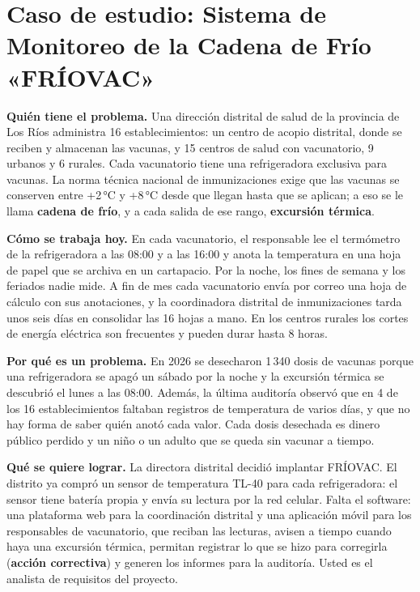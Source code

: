 \documentclass[11pt]{article}
\newcommand{\seccion}[1]{\section{\textcolor{utegreendk}{#1}}}
\begin{document}

\seccion{Caso de estudio: Sistema de Monitoreo de la Cadena de Frío «FRÍOVAC»}




\begin{cajacaso}[title={El problema que hay que resolver}]

	\textbf{Quién tiene el problema.} Una dirección distrital de salud de la provincia de Los Ríos administra 16 establecimientos: un centro de acopio distrital, donde se reciben y almacenan las vacunas, y 15 centros de salud con vacunatorio, 9 urbanos y 6 rurales. Cada vacunatorio tiene una refrigeradora exclusiva para vacunas. La norma técnica nacional de inmunizaciones exige que las vacunas se conserven entre +2\,°C y +8\,°C desde que llegan hasta que se aplican; a eso se le llama \textbf{cadena de frío}, y a cada salida de ese rango, \textbf{excursión térmica}.\par\smallskip

	\textbf{Cómo se trabaja hoy.} En cada vacunatorio, el responsable lee el termómetro de la refrigeradora a las 08:00 y a las 16:00 y anota la temperatura en una hoja de papel que se archiva en un cartapacio. Por la noche, los fines de semana y los feriados nadie mide. A fin de mes cada vacunatorio envía por correo una hoja de cálculo con sus anotaciones, y la coordinadora distrital de inmunizaciones tarda unos seis días en consolidar las 16 hojas a mano. En los centros rurales los cortes de energía eléctrica son frecuentes y pueden durar hasta 8 horas.\par\smallskip

	\textbf{Por qué es un problema.} En 2026 se desecharon 1\,340 dosis de vacunas porque una refrigeradora se apagó un sábado por la noche y la excursión térmica se descubrió el lunes a las 08:00. Además, la última auditoría observó que en 4 de los 16 establecimientos faltaban registros de temperatura de varios días, y que no hay forma de saber quién anotó cada valor. Cada dosis desechada es dinero público perdido y un niño o un adulto que se queda sin vacunar a tiempo.\par\smallskip

	\textbf{Qué se quiere lograr.} La directora distrital decidió implantar FRÍOVAC. El distrito ya compró un sensor de temperatura TL-40 para cada refrigeradora: el sensor tiene batería propia y envía su lectura por la red celular. Falta el software: una plataforma web para la coordinación distrital y una aplicación móvil para los responsables de vacunatorio, que reciban las lecturas, avisen a tiempo cuando haya una excursión térmica, permitan registrar lo que se hizo para corregirla (\textbf{acción correctiva}) y generen los informes para la auditoría. Usted es el analista de requisitos del proyecto.

\end{cajacaso}
\end{document}
